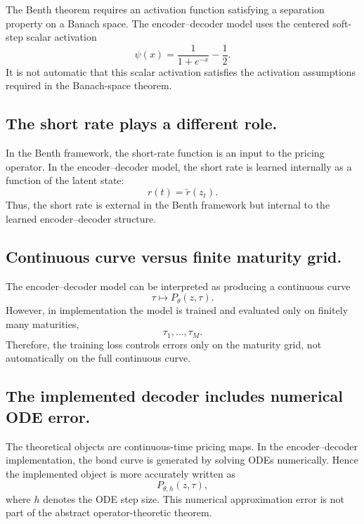 The Benth theorem requires an activation function satisfying a separation property on
a Banach space. The encoder--decoder model uses the centered soft-step scalar
activation
\[
    \psi(x)=\frac{1}{1+e^{-x}}-\frac12.
\]
It is not automatic that this scalar activation satisfies the activation assumptions
required in the Banach-space theorem.

\subsection{The short rate plays a different role.}

In the Benth framework, the short-rate function is an input to the pricing operator.
In the encoder--decoder model, the short rate is learned internally as a function of
the latent state:
\[
    r(t)=\widetilde r(z_t).
\]
Thus, the short rate is external in the Benth framework but internal to the learned
encoder--decoder structure.

\subsection{Continuous curve versus finite maturity grid.}

The encoder--decoder model can be interpreted as producing a continuous curve
\[
    \tau\mapsto P_\theta(z,\tau).
\]
However, in implementation the model is trained and evaluated only on finitely many
maturities,
\[
    \tau_1,\ldots,\tau_M.
\]
Therefore, the training loss controls errors only on the maturity grid, not
automatically on the full continuous curve.

\subsection{The implemented decoder includes numerical ODE error.}

The theoretical objects are continuous-time pricing maps. In the encoder--decoder
implementation, the bond curve is generated by solving ODEs numerically. Hence the
implemented object is more accurately written as
\[
    P_{\theta,h}(z,\tau),
\]
where \(h\) denotes the ODE step size. This numerical approximation error is not part
of the abstract operator-theoretic theorem.
